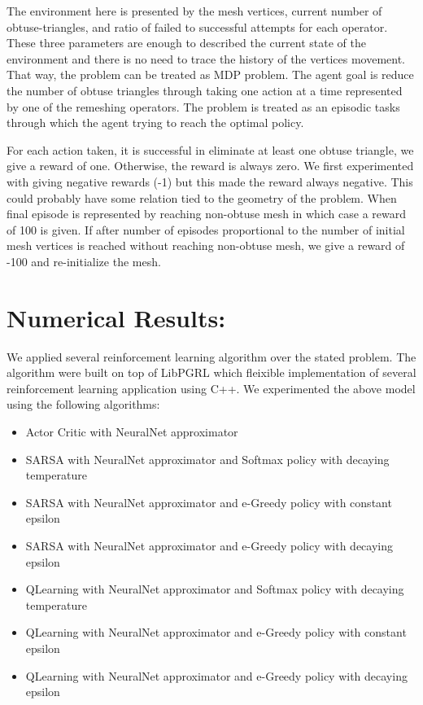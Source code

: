 \documentclass[a4paper,10pt]{article}
\begin{document}
The environment here is presented by the mesh vertices, current number of obtuse-triangles, and ratio of failed to successful attempts for each operator. These three parameters are enough to  described the current state of the environment and there is no need to trace the history of the vertices movement. That way, the problem can be treated as MDP problem. The agent goal is reduce the number of obtuse triangles through taking one action at a time represented by one of the remeshing operators. The problem is treated as an episodic tasks through which the agent trying to reach the optimal policy. 

For each action taken, it is successful in eliminate at least one obtuse triangle, we give a reward of one. Otherwise, the reward is always zero. We first experimented with giving negative rewards (-1) but this made the reward always negative. This could probably have some relation tied to the geometry of the problem. When final episode is represented by reaching non-obtuse mesh in which case a reward of 100 is given. If after number of episodes proportional to the number of initial mesh vertices is reached without reaching non-obtuse mesh, we give a reward of -100 and re-initialize the mesh. 


\section{Numerical Results:}
We applied several reinforcement learning algorithm over the stated problem. The algorithm were built on top of LibPGRL \citep{libpgrl} which fleixible implementation of several reinforcement learning application using C++. We experimented the above model using the following algorithms:
\begin{itemize}
\item Actor Critic with NeuralNet approximator
\item SARSA with NeuralNet approximator and Softmax policy with decaying temperature
\item SARSA with NeuralNet approximator and e-Greedy policy with constant epsilon
\item SARSA with NeuralNet approximator and e-Greedy policy with decaying epsilon
\item QLearning with NeuralNet approximator and Softmax policy with decaying temperature
\item QLearning with NeuralNet approximator and e-Greedy policy with constant epsilon
\item QLearning with NeuralNet approximator and e-Greedy policy with decaying epsilon
\end{itemize}
\end{document}
